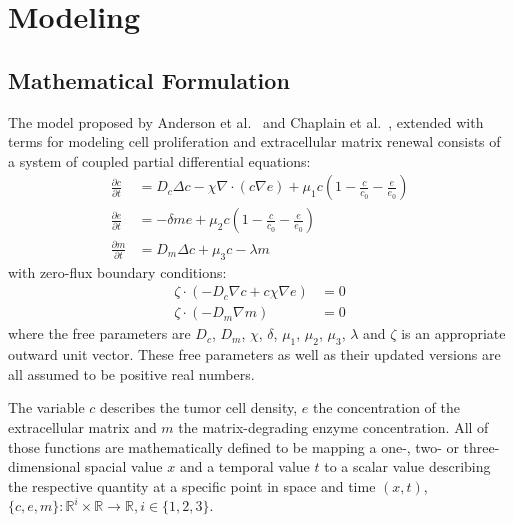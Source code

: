 \section{Modeling}

\subsection{Mathematical Formulation}

The model proposed by Anderson et al.~\cite{anderson_continuous_1998,anderson_mathematical_2000} and Chaplain et al.~\cite{anderson_continuous_1998,chaplain_mathematical_2006-1,franssen_mathematical_2019}, extended with terms for modeling cell proliferation and extracellular matrix renewal consists of a system of coupled partial differential equations: 
\begin{align}
	\frac{\partial c}{\partial t} &= D_c \Delta c - \chi \nabla \cdot (c\nabla e)  + \mu_1 c\left(1-\frac{c}{c_0}-\frac{e}{e_0}\right)\label{eq1}\\
	\frac{\partial e}{\partial t} &= -\delta m e  + \mu_2 c\left(1-\frac{c}{c_0}-\frac{e}{e_0}\right)\label{eq2}\\
	\frac{\partial m}{\partial t} &= D_m \Delta c + \mu_3 c - \lambda m\label{eq3}
\end{align}
with zero-flux boundary conditions:
\begin{align}
	\zeta \cdot  (-D_c \nabla c + c \chi\nabla e) &= 0 \label{eq4}\\
	\zeta \cdot (-D_m\nabla m ) &= 0\label{eq5}
\end{align}
where the free parameters are $D_c$, $D_m$, $\chi$, $\delta$, $\mu_1$, $\mu_2$, $\mu_3$, $\lambda$ and $\zeta$ is an appropriate outward unit vector. These free parameters as well as their updated versions are all assumed to be positive real numbers.

The variable $c$ describes the tumor cell density, $e$ the concentration of the extracellular matrix and $m$ the matrix-degrading enzyme concentration. All of those functions are mathematically defined to be mapping a one-, two- or three-dimensional spacial value $x$ and a temporal value $t$ to a scalar value describing the respective quantity at a specific point in space and time $(x,t)$, $\{c,e,m\}: \mathbb{R}^{i} \times \mathbb{R} \rightarrow \mathbb{R}, i \in \{1,2,3\}$.

